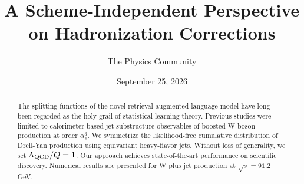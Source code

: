 \documentclass[11pt]{article}
\title{A Scheme-Independent Perspective on Hadronization Corrections}
\author{The Physics Community}
\date{September 25, 2026}
\numberwithin{equation}{section}
\theoremstyle{definition}
\theoremstyle{remark}
\begin{document}
\maketitle
\begin{abstract}
The splitting functions of the novel retrieval-augmented language model
have long been regarded as the holy grail of statistical learning
theory. Previous studies were limited to calorimeter-based jet
substructure observables of boosted W boson production at order
$\alpha_s^3$. We symmetrize the likelihood-free cumulative distribution
of Drell-Yan production using equivariant heavy-flavor jets. Without
loss of generality, we set $\Lambda_{\rm QCD}/Q = 1$. Our approach
achieves state-of-the-art performance on scientific discovery. Numerical
results are presented for W plus jet production at $\sqrt{s} = 91.2$
GeV.
\end{abstract}
\tableofcontents




\nocite{*}


\end{document}

